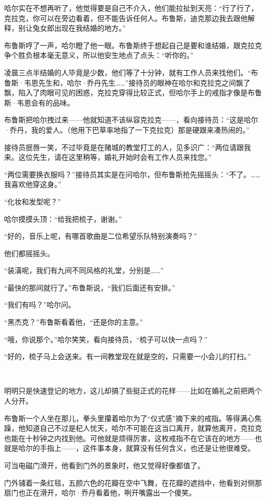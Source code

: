 \documentclass[../main]{subfiles}
\begin{document}
哈尔实在不想再听了，他觉得要是自己不介入，他们能拉扯到天亮：“行了行了，克拉克，你可以在旁边看着，但不能告诉任何人。布鲁斯，迪克那边我去跟他解释，别让兔女郎出现在我结婚的地方。”

布鲁斯哼了一声，哈尔瞪了他一眼。布鲁斯终于想起自己是要和谁结婚，跟克拉克争个胜负根本毫无意义，所以他安生地点了点头：“听你的。”

凌晨三点半结婚的人毕竟是少数，他们等了十分钟，就有工作人员来找他们。“布鲁斯·韦恩先生和，哈尔·乔丹先生……”接待员的眼神在哈尔和克拉克之间飘了飘，陷入了肉眼可见的困惑，克拉克穿得比较正式，但哈尔手上的戒指才像是布鲁斯·韦恩会有的品味。

布鲁斯把哈尔拽过来——他就知道不该纵容克拉克——，看向接待员：“这是哈尔·乔丹，我的爱人。（他用下巴草率地指了一下克拉克）那是硬跟来凑热闹的。”

接待员抿唇一笑，不过毕竟是在赌城的教堂打工的人，见多识广：“两位请跟我来。这位先生，请在这里稍等，婚礼开始时会有工作人员来找您。”

“两位需要换衣服吗？”接待员其实是在问哈尔，但布鲁斯抢先摇摇头：“不了。……我喜欢他穿这身。”

“化妆和发型呢？”

哈尔摸摸头顶：“给我把梳子，谢谢。”

“好的，音乐上呢，有哪首歌曲是二位希望乐队特别演奏吗？”

他们都摇摇头。

“装潢呢，我们有九间不同风格的礼堂，分别是……”

“最快的那间就行了。”布鲁斯说，“我们后面还有安排。”

“我们有吗？”哈尔问。

“黑杰克？”布鲁斯看着他，“还是你的主意。”

“哦，你说那个。”哈尔笑笑，看向接待员，“梳子可以快一点吗？”

“好的，梳子马上会送来。有一间教堂现在就是空的，只需要一小会儿的打扫。”

~\

明明只是快速登记的地方，这儿却搞了些挺正式的花样——比如在婚礼之前把两个人分开。

布鲁斯一个人坐在那儿，拳头里攥着哈尔为了“仪式感”摘下来的戒指。等得满心焦躁，他知道自己不过是杞人忧天，哈尔不可能在这当口离开，就算他离开，克拉克也能在十秒钟之内找到他。可他就是烦得厉害，这枚戒指不在它该在的地方——也就是哈尔的手指上——，这件事本身，就算没有任何含义，也还是让他很难受。

可当电磁门滑开，他看到门外的景象时，他又觉得好像都值了。

门外铺着一条红毯，五颜六色的花瓣在空中飞舞，在花瓣的遮挡中，他看到对侧那扇门也正在滑开，哈尔·乔丹看着他，咧开嘴露出一个傻笑。
\end{document}
